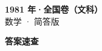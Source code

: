 \documentclass[zihao=-4, a4paper]{ctexart}
\begin{document}
\begin{center}
  {\Large\bfseries 1981 年·全国卷（文科）}\\[4pt]
  {\large 数学 · 简答版}
\end{center}
\medskip
{}

\clearpage
{}
\begin{center}{\Large\bfseries 答案速查}\end{center}
\medskip

\end{document}
